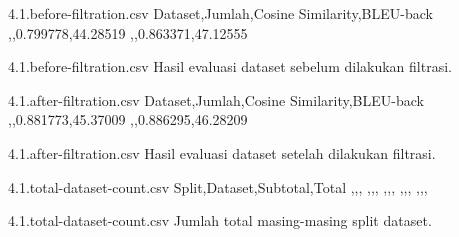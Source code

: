 \begin{filecontents*}{4.1.before-filtration.csv}
  Dataset,Jumlah,Cosine Similarity,BLEU-back
  ,,0.799778,44.28519
  ,,0.863371,47.12555
\end{filecontents*}
  {4.1.before-filtration.csv}
  {Hasil evaluasi dataset sebelum dilakukan filtrasi.}

\begin{filecontents*}{4.1.after-filtration.csv}
  Dataset,Jumlah,Cosine Similarity,BLEU-back
  ,,0.881773,45.37009
  ,,0.886295,46.28209
\end{filecontents*}
  {4.1.after-filtration.csv}
  {Hasil evaluasi dataset setelah dilakukan filtrasi.}

\begin{filecontents*}{4.1.total-dataset-count.csv}
  Split,Dataset,Subtotal,Total
  ,,,
  ,,,
  ,,,
  ,,,
  ,,,
\end{filecontents*}
  {4.1.total-dataset-count.csv}
  {Jumlah total masing-masing split dataset.}
